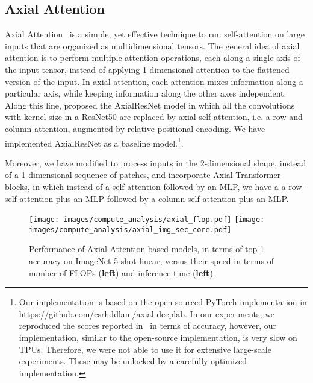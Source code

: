 \subsection{Axial Attention}
Axial Attention~\citep{huang2020ccnet,ho2019-axialattention} is a simple, yet effective technique to run self-attention on large inputs that are organized as multidimensional tensors. The general idea of axial attention is to perform multiple attention operations, each along a single axis of the input tensor, instead of applying 1-dimensional attention to the flattened version of the input. In axial attention, each attention mixes information along a particular axis, while keeping information along the other axes independent. 
Along this line, \citet{wang2020axial} proposed the AxialResNet model in which all the convolutions with kernel size  in a ResNet50 are replaced by axial self-attention, i.e. a row and column attention, augmented by relative positional encoding. 
We have implemented AxialResNet as a baseline model.\footnote{Our implementation is based on the open-sourced PyTorch implementation in \url{https://github.com/csrhddlam/axial-deeplab}. In our experiments, we reproduced the scores reported in~\citep{wang2020axial} in terms of accuracy, however, our implementation, similar to the open-source implementation, is very slow on TPUs.
Therefore, we were not able to use it for extensive large-scale experiments.
These may be unlocked by a carefully optimized implementation.}.

Moreover, we have modified \oursabbrv to process inputs in the 2-dimensional shape, instead of a 1-dimensional sequence of patches, and incorporate Axial Transformer blocks, in which instead of a self-attention followed by an MLP, we have a a row-self-attention plus an MLP followed by a column-self-attention plus an MLP. 
\begin{figure}[h]
    \centering
    \texttt{[image: images/compute\_analysis/axial\_flop.pdf]}
    \hspace{10pt}
    \texttt{[image: images/compute\_analysis/axial\_img\_sec\_core.pdf]}
    \caption{Performance of Axial-Attention based models, in terms of top-1 accuracy on ImageNet 5-shot linear, versus their speed in terms of number of FLOPs (\textbf{left}) and inference time (\textbf{left}).}
    \label{fig:axial_compute_performance}
\end{figure}

